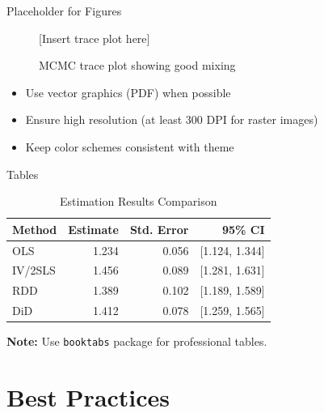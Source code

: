 \documentclass[aspectratio=169]{beamer}
\begin{document}
\begin{frame}{Placeholder for Figures}
  \begin{figure}
    \centering
    \textcolor{ESMADGray}{[Insert trace plot here]}
    \caption{MCMC trace plot showing good mixing}
  \end{figure}

  \begin{itemize}
    \item Use vector graphics (PDF) when possible
    \item Ensure high resolution (at least 300 DPI for raster images)
    \item Keep color schemes consistent with theme
  \end{itemize}
\end{frame}

\begin{frame}{Tables}
  \begin{table}
    \centering
    \caption{Estimation Results Comparison}
    \begin{tabular}{lrrr}
      \toprule
      Method & Estimate & Std. Error & 95\% CI \\
      \midrule
      OLS & 1.234 & 0.056 & [1.124, 1.344] \\
      IV/2SLS & 1.456 & 0.089 & [1.281, 1.631] \\
      RDD & 1.389 & 0.102 & [1.189, 1.589] \\
      DiD & 1.412 & 0.078 & [1.259, 1.565] \\
      \bottomrule
    \end{tabular}
  \end{table}

  \textbf{Note:} Use \texttt{booktabs} package for professional tables.
\end{frame}

\section{Best Practices}
\end{document}
